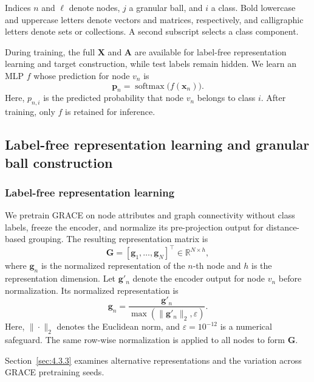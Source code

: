 \documentclass[times,review,10pt]{elsarticle}
\theoremstyle{definition}
\theoremstyle{plain}
\begin{document}
Indices \(n\) and \(\ell\) denote nodes, \(j\) a granular ball, and \(i\) a class. Bold lowercase and uppercase letters denote vectors and matrices, respectively, and calligraphic letters denote sets or collections. A second subscript selects a class component.


During training, the full \(\mathbf X\) and \(\mathbf A\) are available for label-free representation learning and target construction, while test labels remain hidden. We learn an MLP \(f\) whose prediction for node \(v_n\) is
\begin{equation}\label{eq:1}
\mathbf p_n=\operatorname{softmax}\bigl(f(\mathbf x_n)\bigr).
\end{equation}
Here, \(p_{n,i}\) is the predicted probability that node \(v_n\) belongs to class \(i\). After training, only \(f\) is retained for inference.

\subsection{Label-free representation learning and granular ball construction}\label{sec:3.2}

\subsubsection{Label-free representation learning}\label{sec:3.2.1}

We pretrain GRACE \cite{ref12} on node attributes and graph connectivity without class labels, freeze the encoder, and normalize its pre-projection output for distance-based grouping. The resulting representation matrix is
\begin{equation}\label{eq:2}
\mathbf G=[\mathbf g_1,\ldots,\mathbf g_N]^\top\in\mathbb R^{N\times h},
\end{equation}
where \(\mathbf g_n\) is the normalized representation of the \(n\)-th node and \(h\) is the representation dimension. Let \(\mathbf g'_n\) denote the encoder output for node \(v_n\) before normalization. Its normalized representation is
\begin{equation}\label{eq:3}
\mathbf g_n=\frac{\mathbf g'_n}{\max(\|\mathbf g'_n\|_2,\varepsilon)}.
\end{equation}
Here, \(\|\cdot\|_2\) denotes the Euclidean norm, and \(\varepsilon=10^{-12}\) is a numerical safeguard. The same row-wise normalization is applied to all nodes to form \(\mathbf G\).

Section~\ref{sec:4.3.3} examines alternative representations and the variation across GRACE pretraining seeds.
\end{document}
